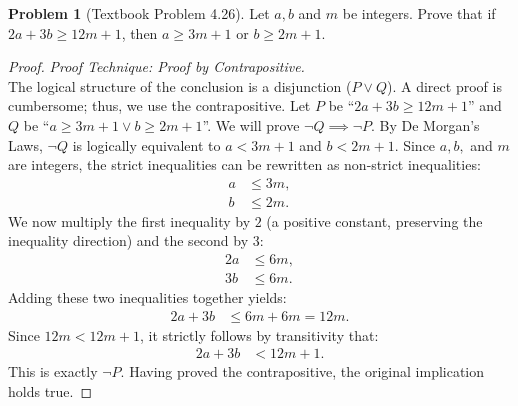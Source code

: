 \documentclass[11pt]{article}
\theoremstyle{definition}
\newtheorem{problem}{Problem}
\theoremstyle{remark}
\begin{document}
\begin{itemize}
\begin{problem}[Textbook Problem 4.26]
Let $a, b$ and $m$ be integers. Prove that if $2a + 3b \ge 12m + 1$, then $a \ge 3m + 1$ or $b \ge 2m + 1$.
\end{problem}
\begin{proof}
\textit{Proof Technique: Proof by Contrapositive.} \\
The logical structure of the conclusion is a disjunction ($P \lor Q$). A direct proof is cumbersome; thus, we use the contrapositive. 
Let $P$ be ``$2a + 3b \ge 12m + 1$'' and $Q$ be ``$a \ge 3m + 1 \lor b \ge 2m + 1$''. We will prove $\neg Q \implies \neg P$.
By De Morgan's Laws, $\neg Q$ is logically equivalent to $a < 3m + 1$ and $b < 2m + 1$.
Since $a, b,$ and $m$ are integers, the strict inequalities can be rewritten as non-strict inequalities:
\begin{align*}
    a &\le 3m, \\
    b &\le 2m.
\end{align*}
We now multiply the first inequality by $2$ (a positive constant, preserving the inequality direction) and the second by $3$:
\begin{align*}
    2a &\le 6m, \\
    3b &\le 6m.
\end{align*}
Adding these two inequalities together yields:
\begin{align*}
    2a + 3b &\le 6m + 6m = 12m.
\end{align*}
Since $12m < 12m + 1$, it strictly follows by transitivity that:
\begin{align*}
    2a + 3b &< 12m + 1.
\end{align*}
This is exactly $\neg P$. Having proved the contrapositive, the original implication holds true.
\end{proof}


\end{itemize}
\end{document}
